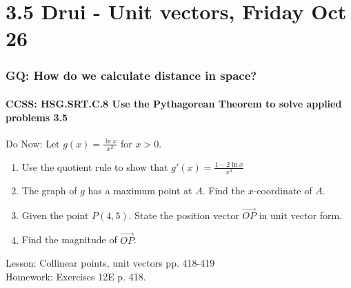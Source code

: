 \documentclass{beamer}
\begin{document}
\section{3.5 Drui - Unit vectors, Friday Oct 26}
  \frame
  {
    \frametitle{GQ: How do we calculate distance in space?}
    \framesubtitle{CCSS: HSG.SRT.C.8 Use the Pythagorean Theorem to solve applied problems \qquad \alert{3.5}}

    \begin{block}{Do Now: Let $\displaystyle g(x)=\frac{\ln x}{x^2}$ for $x>0$.}
    \begin{enumerate}
        \item Use the quotient rule to show that $\displaystyle g'(x)=\frac{1-2\ln x}{x^3}$
        \item The graph of $g$ has a maximum point at $A$. Find the $x$-coordinate of $A$.
        \item Given the point $P(4,5)$. State the position vector $\overrightarrow{OP}$ in unit vector form.
        \item Find the magnitude of $\overrightarrow{OP}$.
    \end{enumerate}
    \end{block}
    Lesson: Collinear points, unit vectors pp. 418-419\\ \bigskip
    Homework: Exercises 12E p. 418.
  }
\end{document}
